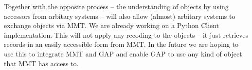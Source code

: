 \documentclass{deliverablereport}
\begin{document}
Together with the opposite process -- the understanding of objects by using accessors from arbitary systems -- will also allow (almost) arbitary systems to exchange objects via MMT. We are already working on a Python Client implementation. This will not apply any recoding to the objects -- it just retrieves records in an easily accessible form from MMT. In the future we are hoping to use this to integrate MMT and GAP and enable GAP to use any kind of object that MMT has access to.

\newpage\printbibliography
{}
\end{document}
